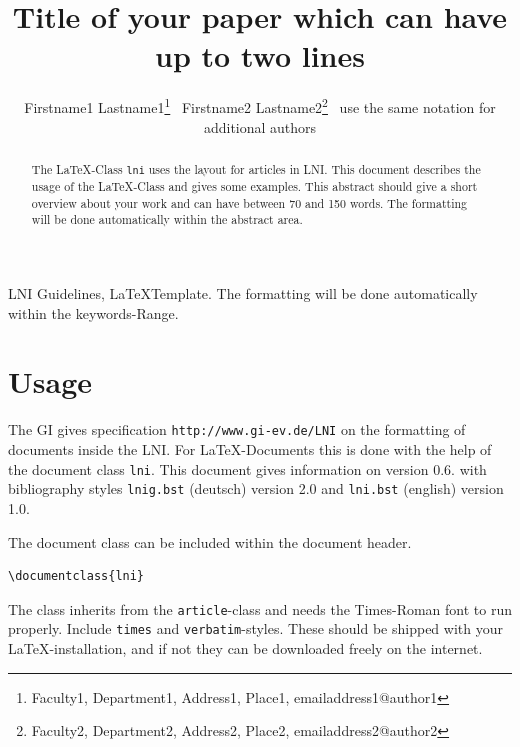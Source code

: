 \documentclass[english]{lni}
\author{Firstname1 Lastname1\footnote{Faculty1, Department1, Address1, Place1, emailaddress1@author1} \, Firstname2 Lastname2\footnote{Faculty2, Department2, Address2, Place2, emailaddress2@author2} \ use the same notation for additional authors}
\title{Title of your paper which can have up to two lines}
\renewcommand{\headrulewidth}{0.4pt} %
\begin{document}
\maketitle

\renewcommand{\refname}{References}
\setcounter{footnote}{2} %
\thispagestyle{titlepage}
\pagestyle{fancy}
\fancyhead{} %
\fancyfoot{} %
\renewcommand{\headrulewidth}{0.4pt} %

\begin{abstract}
	The \LaTeX-Class \texttt{lni} uses the layout for articles in LNI. This document describes the usage of the \LaTeX-Class and gives some examples. This abstract should give a short overview about your work and can have between 70 and 150 words. The formatting will be done automatically within the abstract area.
\end{abstract}
\begin{keywords}
	LNI Guidelines, \LaTeX Template. The formatting will be done automatically within the keywords-Range.
\end{keywords}

\section{Usage}
The GI gives specification \texttt{http://www.gi-ev.de/LNI} on the formatting of documents inside the LNI. For \LaTeX-Documents this is done with the help of the document class \texttt{lni}. This document gives information on version 0.6. with bibliography styles \texttt{lnig.bst} (deutsch) version 2.0 and \texttt{lni.bst} (english) version 1.0.

The document class can be included within the document header.

\begin{verbatim}
\documentclass{lni}
\end{verbatim}

The class inherits from the \texttt{article}-class and needs the Times-Roman font to run properly. Include \texttt{times} and \texttt{verbatim}-styles. These should be shipped with your \LaTeX-installation, and if not they can be downloaded freely on the internet.
\end{document}
